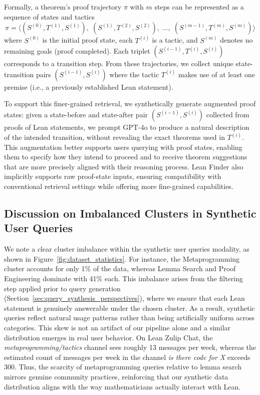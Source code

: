 \documentclass{article} %
\begin{document}
Formally, a theorem's proof trajectory $\pi$ with $m$ steps can be represented as a sequence of states and tactics
\[
\pi = \big\langle (S^{(0)}, T^{(1)}, S^{(1)}), \; (S^{(1)}, T^{(2)}, S^{(2)}), \;\dots,\; (S^{(m-1)}, T^{(m)}, S^{(m)}) \big\rangle
\]
where $S^{(0)}$ is the initial proof state, each $T^{(i)}$ is a tactic, and $S^{(m)}$ denotes no remaining goals (proof completed). Each triplet $(S^{(i-1)}, T^{(i)}, S^{(i)})$ corresponds to a transition step. From these trajectories, we collect unique state-transition pairs $(S^{(i-1)}, S^{(i)})$ where the tactic $T^{(i)}$ makes use of at least one premise (i.e., a previously established Lean statement).

To support this finer-grained retrieval, we synthetically generate augmented proof states: given a state-before and state-after pair $(S^{(i-1)}, S^{(i)})$ collected from proofs of Lean statements, we prompt GPT-4o to produce a natural description of the intended transition, without revealing the exact theorems used in $T^{(i)}$. This augmentation better supports users querying with proof states, enabling them to specify how they intend to proceed and to receive theorem suggestions that are more precisely aligned with their reasoning process. Lean Finder also implicitly supports raw proof-state inputs, ensuring compatibility with conventional retrieval settings while offering more fine-grained capabilities.

\subsection{Discussion on Imbalanced Clusters in Synthetic User Queries}
\label{imbalance_discussion}
We note a clear cluster imbalance within the synthetic user queries modality, as shown in Figure~\ref{fig:dataset_statistics}. For instance, the Metaprogramming cluster accounts for only 1\% of the data, whereas Lemma Search and Proof Engineering dominate with 41\% each. This imbalance arises from the filtering step applied prior to query generation (Section~\ref{sec:query_synthesis_perspectives}), where we ensure that each Lean statement is genuinely answerable under the chosen cluster. As a result, synthetic queries reflect natural usage patterns rather than being artificially uniform across categories. This skew is not an artifact of our pipeline alone and a similar distribution emerges in real user behavior. On Lean Zulip Chat, the \emph{metaprogramming/tactics} channel sees roughly 13 messages per week, whereas the estimated count of messages per week in the channel \emph{is there code for X} exceeds 300. Thus, the scarcity of metaprogramming queries relative to lemma search mirrors genuine community practices, reinforcing that our synthetic data distribution aligns with the way mathematicians actually interact with Lean.
\end{document}
